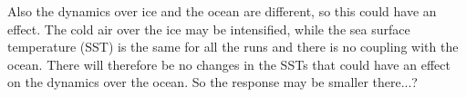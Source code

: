 Also the dynamics over ice and the ocean are different, so this could have an effect. The cold air over the ice may be intensified, while the sea surface temperature (SST) is the same for all the runs and there is no coupling with the ocean. There will therefore be no changes in the SSTs that could have an effect on the dynamics over the ocean. So the response may be smaller there...?




